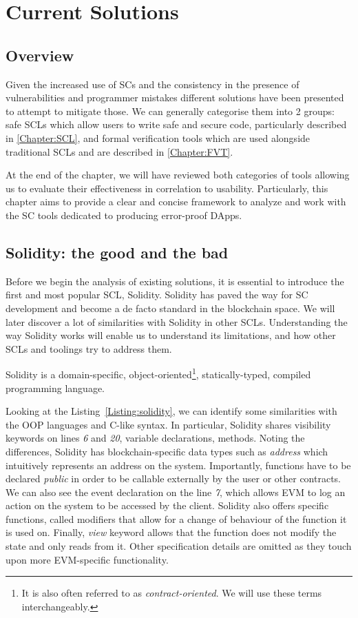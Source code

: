 \documentclass[oneside]{ecsproject}     %
\newcommand{\lref}[1]{Listing~\ref{#1}}
\begin{document}
\chapter{Current Solutions}

\section{Overview}

Given the increased use of SCs and the consistency in the presence of vulnerabilities and programmer mistakes
different solutions have been presented to attempt to mitigate those. 
We can generally categorise them into 2 groups: safe SCLs which allow users to write safe and secure code, particularly described in \cref{Chapter:SCL}, 
and formal verification tools which are used alongside traditional SCLs and are described in \cref{Chapter:FVT}.

At the end of the chapter, we will have reviewed both categories of tools allowing us to evaluate their effectiveness in correlation to usability.
Particularly, this chapter aims to provide a clear and concise framework to analyze and work with the SC tools dedicated to producing
error-proof DApps. 

\section{Solidity: the good and the bad}

Before we begin the analysis of existing solutions, it is essential to introduce the first and most popular SCL, Solidity\cite{sc_survey}\cite{solidity_docs}.
Solidity has paved the way for SC development and become a de facto standard in the blockchain space. We will later discover a lot of similarities with Solidity in other SCLs.
Understanding the way Solidity works will enable us to understand its limitations, and how other SCLs and toolings try to address them.

Solidity is a domain-specific, object-oriented\footnote{It is also often referred to as \textit{contract-oriented}. We will use these terms interchangeably.}, statically-typed, compiled
programming language\cite{solidity_docs}.

Looking at the \lref{Listing:solidity}, we can identify some similarities with the OOP languages and C-like syntax.
In particular, Solidity shares visibility keywords on lines \textit{6} and \textit{20}, variable declarations, methods.
Noting the differences, Solidity has blockchain-specific data types such as \textit{address} which intuitively represents an address on the system.
Importantly, functions have to be declared \textit{public} in order to be callable externally by the user or other contracts.
We can also see the event declaration on the line \textit{7}, which allows EVM to log an action on the system to be accessed by the client.
Solidity also offers specific functions, called modifiers that allow for a change of behaviour of the function it is used on\cite{solidity_docs}.
Finally, \textit{view} keyword allows that the function does not modify the state and only reads from it.
Other specification details are omitted as they touch upon more EVM-specific functionality.
\end{document}

